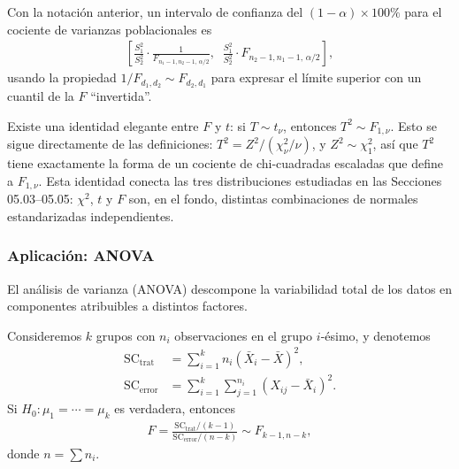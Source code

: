 \begin{teorema}
 \label{eq:5.5.1}
Con la notaci\'on anterior, un intervalo de confianza del $(1-\alpha)\times 100\%$
para el cociente de varianzas poblacionales es
\begin{align}
 \left[\frac{S_1^2}{S_2^2}\cdot\frac{1}{F_{n_1-1,n_2-1,\,\alpha/2}},\;\;
 \frac{S_1^2}{S_2^2}\cdot F_{n_2-1,n_1-1,\,\alpha/2}\right],
\end{align}
usando la propiedad $1/F_{d_1,d_2} \sim F_{d_2,d_1}$ para expresar el l\'imite
superior con un cuantil de la $F$ ``invertida''.
\end{teorema}

\begin{observacion}
Existe una identidad elegante entre $F$ y $t$: si $T \sim t_\nu$, entonces
$T^2 \sim F_{1,\nu}$. Esto se sigue directamente de las definiciones: $T^2 =
Z^2/(\chi^2_\nu/\nu)$, y $Z^2 \sim \chi^2_1$, as\'i que $T^2$ tiene exactamente la
forma de un cociente de chi-cuadradas escaladas que define a $F_{1,\nu}$. Esta
identidad conecta las tres distribuciones estudiadas en las Secciones
05.03--05.05: $\chi^2$, $t$ y $F$ son, en el fondo, distintas combinaciones de
normales estandarizadas independientes.
\end{observacion}

\subsubsection{Aplicaci\'on: ANOVA}

El an\'alisis de varianza (ANOVA) descompone la variabilidad total de los datos en
componentes atribuibles a distintos factores.

\begin{teorema}
Consideremos $k$ grupos con $n_i$ observaciones en el grupo $i$-\'esimo, y denotemos
\begin{align}
 \text{SC}_{\text{trat}} &= \sum_{i=1}^k n_i (\bar{X}_i - \bar{X})^2, \\
 \text{SC}_{\text{error}} &= \sum_{i=1}^k \sum_{j=1}^{n_i} (X_{ij} - \bar{X}_i)^2.
\end{align}
Si $H_0: \mu_1 = \cdots = \mu_k$ es verdadera, entonces
\begin{align}
 \label{eq:3.2.18}
 F = \frac{\text{SC}_{\text{trat}}/(k-1)}{\text{SC}_{\text{error}}/(n-k)} \sim F_{k-1, n-k},
\end{align}
donde $n = \sum n_i$.
\end{teorema}

